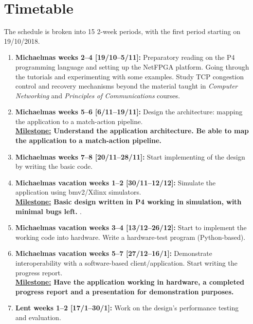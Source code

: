 \section*{\fontsize{18pt}{1}\selectfont Timetable}

The schedule is broken into 15 2-week periods, with the first period starting on 19/10/2018.

\begin{enumerate}
	\item \textbf{Michaelmas weeks 2--4 [19/10--5/11]:} Preparatory reading on the P4 programming language and setting up the NetFPGA platform. Going through the tutorials and experimenting with some examples. Study TCP congestion control and recovery mechanisms beyond the material taught in \emph{Computer Networking} and \emph{Principles of Communications} courses.
	
	\item \textbf{Michaelmas weeks 5--6 [6/11--19/11]:} Design the architecture: mapping the application to a match-action pipeline.
	\\
	\textbf{\underline{Milestone:} Understand the application architecture. Be able to map the application to a match-action pipeline.}
	
	\item \textbf{Michaelmas weeks 7--8 [20/11--28/11]:} Start implementing of the design by writing the basic code. 
	
	\item \textbf{Michaelmas vacation weeks 1--2 [30/11--12/12]:} Simulate the application using bmv2/Xilinx simulators. 
	\\
	\textbf{\underline{Milestone:} Basic design written in P4 working in simulation, with minimal bugs left.} .
	
	\item \textbf{Michaelmas vacation weeks 3--4 [13/12--26/12]:} Start to implement the working code into hardware. Write a hardware-test program (Python-based). 
	
	\item \textbf{Michaelmas vacation weeks 5--7 [27/12--16/1]:} Demonstrate interoperability with a software-based client/application. Start writing the progress report.
	\\
	\textbf{\underline{Milestone:} Have the application working in hardware, a completed progress report and a presentation for demonstration purposes.}
	
	\item \textbf{Lent weeks 1--2 [17/1--30/1]:} Work on the design's performance testing and evaluation.
	

\end{enumerate}

